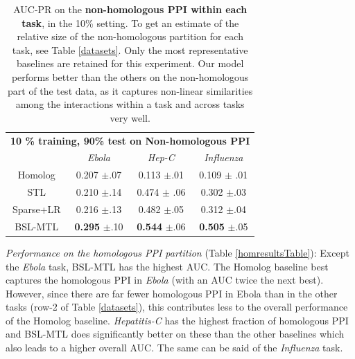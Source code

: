 \documentclass{bioinfo}
\begin{document}
\begin{table}[!h]
\caption{AUC-PR on the \textbf{non-homologous PPI within each task}, in the 10\% setting. To get an estimate of the relative size of the non-homologous partition for each task, see Table \ref{datasets}. Only the most representative baselines are retained for this experiment. Our model performs better than the others on the non-homologous part of the test data, as it captures non-linear similarities among the interactions within a task and across tasks very well.}
\label{nohomresultsTable}
\begin{small}
\begin{center}
\begin{tabular}{c|ccc}
\toprule
\multicolumn{4}{c}{\textbf{10 \% training, 90\% test on Non-homologous PPI}} \\
& \textit{Ebola} & \textit{Hep-C} & \textit{Influenza} \\ \midrule
Homolog & 0.207 $\pm$.07 & 0.113 $\pm$.01 & 0.109 $\pm$ .01 \\
STL  & 0.210 $\pm$.14 & 0.474 $\pm$ .06 & 0.302 $\pm$.03 \\
Sparse+LR & 0.216 $\pm$.13 & 0.482 $\pm$.05 & 0.312 $\pm$.04 \\ 
BSL-MTL & \textbf{0.295} $\pm$.10 & \textbf{0.544} $\pm$.06 & \textbf{0.505} $\pm$.05 \\ \bottomrule
\end{tabular}
\end{center}
\end{small}
\end{table}


\noindent\textit{Performance on the homologous PPI partition} (Table \ref{homresultsTable}):
Except the \textit{Ebola} task, BSL-MTL has the highest AUC. The Homolog baseline best captures the homologous PPI in \textit{Ebola} (with an AUC twice the next best). However, since there are far fewer homologous PPI in Ebola than in the other tasks (row-2 of Table \ref{datasets}), this contributes less to the overall performance of the Homolog baseline. \textit{Hepatitis-C} has the highest fraction of homologous PPI and BSL-MTL does significantly better on these than the other baselines which also leads to a higher overall AUC. The same can be said of the \textit{Influenza} task.
\end{document}
